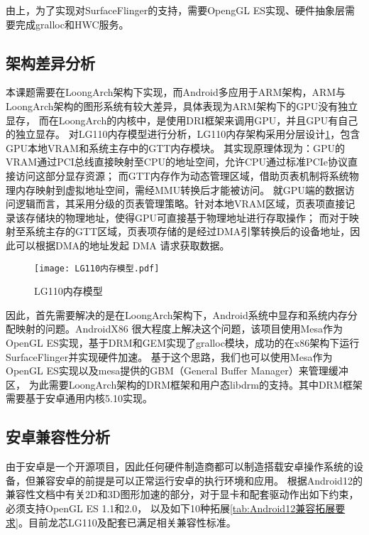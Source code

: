 由上，为了实现对SurfaceFlinger的支持，需要OpengGL ES实现、硬件抽象层需要完成gralloc和HWC服务。 

\subsection{架构差异分析}
\label{sec:架构差异分析}
本课题需要在LoongArch架构下实现，而Android多应用于ARM架构，ARM与LoongArch架构的图形系统有较大差异，具体表现为ARM架构下的GPU没有独立显存\cite{Inki2011}，
而在LoongArch的内核中，是使用DRI框架来调用GPU，并且GPU有自己的独立显存。
对LG110内存模型进行分析，LG110内存架构采用分层设计\ref{fig:LG110内存模型}，包含GPU本地VRAM和系统主存中的GTT内存模块。
其实现原理体现为：GPU的VRAM通过PCI总线直接映射至CPU的地址空间，允许CPU通过标准PCIe协议直接访问这部分显存资源；
而GTT内存作为动态管理区域，借助页表机制将系统物理内存映射到虚拟地址空间，需经MMU转换后才能被访问。
就GPU端的数据访问逻辑而言，其采用分级的页表管理策略。针对本地VRAM区域，页表项直接记录该存储块的物理地址，使得GPU可直接基于物理地址进行存取操作；
而对于映射至系统主存的GTT区域，页表项存储的是经过DMA引擎转换后的设备地址，因此可以根据DMA的地址发起 DMA 请求获取数据。

\begin{figure}
  \centering
  \texttt{[image: LG110内存模型.pdf]}
  \caption{LG110内存模型}
  \label{fig:LG110内存模型}
\end{figure}

因此，首先需要解决的是在LoongArch架构下，Android系统中显存和系统内存分配映射的问题。AndroidX86\cite{AndroidX86}
很大程度上解决这个问题，该项目使用Mesa作为OpenGL ES实现，基于DRM和GEM实现了gralloc模块，成功的在x86架构下运行SurfaceFlinger并实现硬件加速\cite{XTYY201710015}。
基于这个思路，我们也可以使用Mesa作为OpenGL ES实现以及mesa提供的GBM（General Buffer Manager）来管理缓冲区，
为此需要LoongArch架构的DRM框架和用户态libdrm的支持。其中DRM框架需要基于安卓通用内核5.10实现。

\subsection{安卓兼容性分析}
由于安卓是一个开源项目，因此任何硬件制造商都可以制造搭载安卓操作系统的设备，但兼容安卓的前提是可以正常运行安卓的执行环境和应用。
根据Android12的兼容性文档\cite{Android12CDD}中有关2D和3D图形加速的部分，对于显卡和配套驱动作出如下约束，必须支持OpenGL ES 1.1和2.0，
以及如下10种拓展\ref{tab:Android12兼容拓展要求}。目前龙芯LG110及配套已满足相关兼容性标准。

